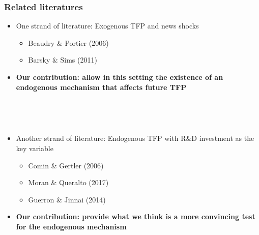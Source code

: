 \documentclass{beamer}
\begin{document}
\begin{frame}
	\frametitle{Related literatures}
	\label{related_lit}
\begin{itemize}
\item One strand of literature: Exogenous TFP and news shocks
	\begin{itemize}
	\item Beaudry \& Portier (2006)
	\item Barsky \& Sims (2011)
	
	\end{itemize}
\item [] \textbf{Our contribution: allow in this setting the existence of an endogenous mechanism that affects future TFP}	


\hyperlink{BS_quote}{}

	\
	
	\
	
\item Another strand of literature: Endogenous TFP with R\&D investment as the key variable
	\begin{itemize}
	\item Comin \& Gertler (2006)
	\item Moran \& Queralto (2017)
	\item  Guerron \& Jinnai (2014)
	
	\end{itemize}	


\item []  \textbf{Our contribution: provide what we think is a more convincing test for the endogenous mechanism}


\end{itemize}



\end{frame}
\end{document}
